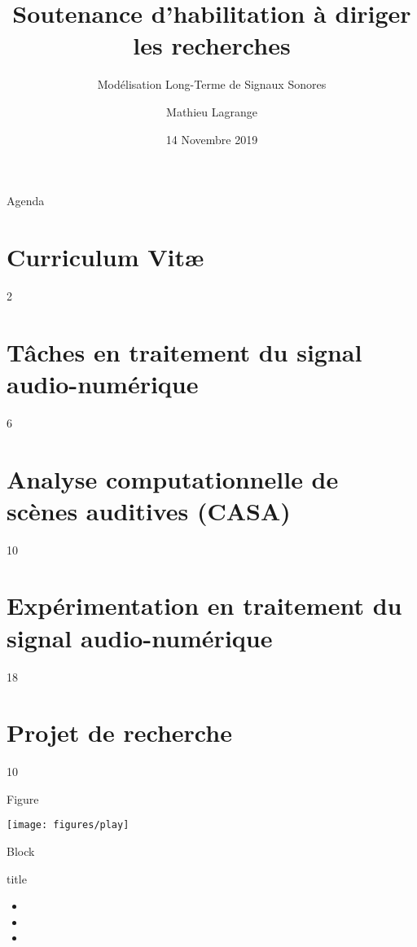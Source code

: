\documentclass[compress]{beamer}
\title[]{\LARGE \bf Soutenance d'habilitation à diriger les recherches}
\subtitle{\og Modélisation Long-Terme de Signaux Sonores \fg}
\author{Mathieu Lagrange
}
\institute[Irccyn]
{
\texttt{[image: figures/logoLs2n]}\\
}
\date[]{14 Novembre 2019}
\begin{document}


\frame{\titlepage \thispagestyle{empty}}

\begin{frame}{Agenda} \tableofcontents \end{frame} %

  \section{Curriculum Vit\ae} 2

  \section[Tâches]{Tâches en traitement du signal audio-numérique} 6

  \section[CASA]{Analyse computationnelle de scènes auditives (CASA)} 10

  \section[Expérimentation]{Expérimentation en traitement du signal audio-numérique} 18

  \section[Projet]{Projet de recherche} 10

\begin{frame}{} \tableofcontents[currentsection] \end{frame}

\begin{frame}{Figure}
\begin{center}
\texttt{[image: figures/play]} \\
\end{center}
\end{frame}

\begin{frame}{Block}
\begin{block}{title}
\begin{itemize}
\item
\item
\item
\end{itemize}
\end{block}
\end{frame}
\end{document}
